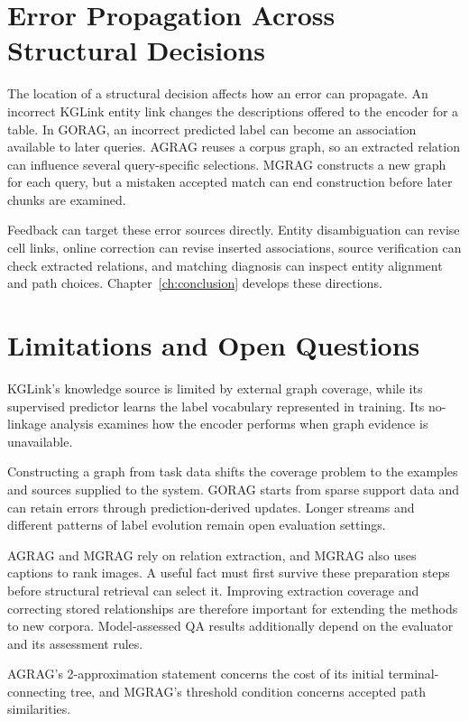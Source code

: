 \section{Error Propagation Across Structural Decisions}
\label{sec:discussion:unit}
The location of a structural decision affects how an error can propagate. An incorrect KGLink entity link changes the descriptions offered to the encoder for a table. In GORAG, an incorrect predicted label can become an association available to later queries. AGRAG reuses a corpus graph, so an extracted relation can influence several query-specific selections. MGRAG constructs a new graph for each query, but a mistaken accepted match can end construction before later chunks are examined.

Feedback can target these error sources directly. Entity disambiguation can revise cell links, online correction can revise inserted associations, source verification can check extracted relations, and matching diagnosis can inspect entity alignment and path choices. Chapter~\ref{ch:conclusion} develops these directions.

\section{Limitations and Open Questions}
\label{sec:discussion:limitations}
KGLink's knowledge source is limited by external graph coverage, while its supervised predictor learns the label vocabulary represented in training. Its no-linkage analysis examines how the encoder performs when graph evidence is unavailable.

Constructing a graph from task data shifts the coverage problem to the examples and sources supplied to the system. GORAG starts from sparse support data and can retain errors through prediction-derived updates. Longer streams and different patterns of label evolution remain open evaluation settings.

AGRAG and MGRAG rely on relation extraction, and MGRAG also uses captions to rank images. A useful fact must first survive these preparation steps before structural retrieval can select it. Improving extraction coverage and correcting stored relationships are therefore important for extending the methods to new corpora. Model-assessed QA results additionally depend on the evaluator and its assessment rules.

AGRAG's 2-approximation statement concerns the cost of its initial terminal-connecting tree, and MGRAG's threshold condition concerns accepted path similarities.

